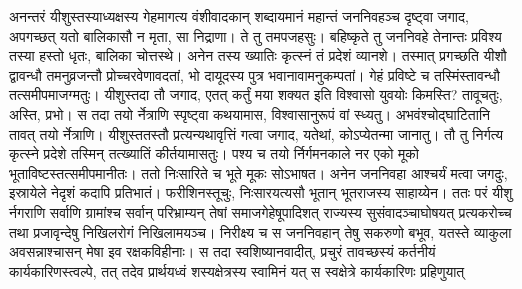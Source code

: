 \vakya अनन्तरं यीशुस्तस्याध्यक्षस्य गेहमागत्य वंशीवादकान् शब्दायमानं महान्तं जननिवहञ्च दृष्ट्वा जगाद,
\vakya अपगच्छत् यतो बालिकासौ न मृता, सा निद्राणा।
\vakya ते तु तमपजहसुः। बहिष्कृते तु जननिवहे तेनान्तः प्रविश्य तस्या हस्तो धृतः, बालिका चोत्तस्थे।
\vakya अनेन तस्य ख्यातिः कृत्स्नं तं प्रदेशं व्यानशे।
\vakya तस्मात् प्रगच्छति यीशौ द्वावन्धौ तमनुव्रजन्तौ प्रोच्चरवेणावदतां, भो दायूदस्य पुत्र भवानावामनुकम्पतां।
\vakya गेहं प्रविष्टे च तस्मिंस्तावन्धौ तत्समीपमाजग्मतुः। यीशुस्तदा तौ जगाद, एतत् कर्तुं मया शक्यत इति विश्वासो युवयोः किमस्ति?
\vakya तावूचतुः, अस्ति, प्रभो। स तदा तयो र्नेत्राणि स्पृष्ट्वा कथयामास, विश्वासानुरूपं वां स्ध्यतु।
\vakya अभवंश्चोद्घाटितानि तावत् तयो र्नेत्राणि। यीशुस्ततस्तौ प्रत्यन्यथावृत्तिं गत्वा जगाद, यतेथां, कोऽप्येतन्मा जानातु।
\vakya तौ तु निर्गत्य कृत्स्ने प्रदेशे तस्मिन् तत्ख्यातिं कीर्तयामासतुः।
\vakya पश्य च तयो र्निर्गमनकाले नर एको मूको भूताविष्टस्तत्समीपमानीतः।
\vakya ततो निःसारिते च भूते मूकः सोऽभाषत। अनेन जननिवहा आश्चर्यं मत्वा जगदुः, इस्रायेले नेदृशं कदापि प्रतिभातं।
\vakya फरीशिनस्तूचुः, निःसारयत्यसौ भूतान् भूतराजस्य साहाय्येन।
\vakya ततः परं यीशु र्नगराणि सर्वाणि ग्रामांश्च सर्वान् परिभ्राम्यन् तेषां समाजगेहेषूपादिशत् राज्यस्य सुसंवादञ्चाघोषयत् प्रत्यकरोच्च तथा प्रजावृन्देषु निखिलरोगं निखिलामयञ्च।
\vakya निरीक्ष्य च स जननिवहान् तेषु सकरुणो बभूव, यतस्ते व्याकुला अवसन्नाश्चासन् मेषा इव रक्षकविहीनाः।
\vakya स तदा स्वशिष्यानवादीत्, प्रचुरं तावच्छस्यं कर्तनीयं कार्यकारिणस्त्वल्पे, तत् तदेव प्रार्थयध्वं शस्यक्षेत्रस्य स्वामिनं यत् स स्वक्षेत्रे कार्यकारिणः प्रहिणुयात्\eoc